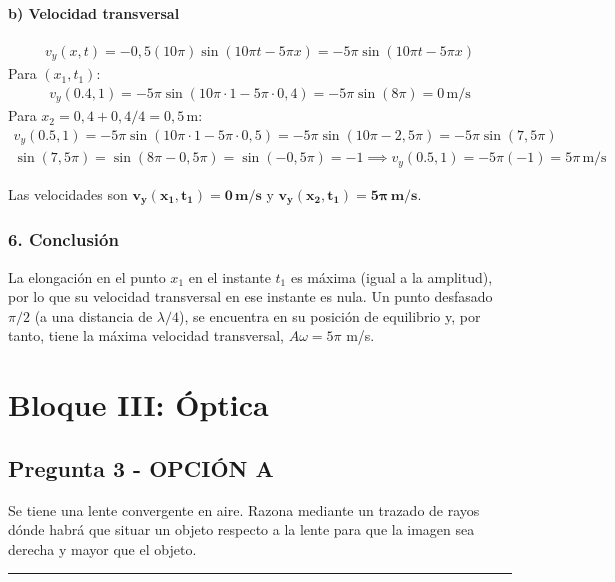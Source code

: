 \paragraph{b) Velocidad transversal}
\begin{gather}
    v_y(x,t) = -0,5(10\pi)\sin(10\pi t - 5\pi x) = -5\pi\sin(10\pi t - 5\pi x)
\end{gather}
Para $(x_1, t_1)$:
\begin{gather}
    v_y(0.4, 1) = -5\pi\sin(10\pi \cdot 1 - 5\pi \cdot 0,4) = -5\pi\sin(8\pi) = 0\,\text{m/s}
\end{gather}
Para $x_2 = 0,4 + 0,4/4 = 0,5\,\text{m}$:
\begin{gather}
    v_y(0.5, 1) = -5\pi\sin(10\pi \cdot 1 - 5\pi \cdot 0,5) = -5\pi\sin(10\pi - 2,5\pi) = -5\pi\sin(7,5\pi) \nonumber \\
    \sin(7,5\pi) = \sin(8\pi - 0,5\pi) = \sin(-0,5\pi) = -1 \implies v_y(0.5,1) = -5\pi(-1) = 5\pi\,\text{m/s}
\end{gather}
\begin{cajaresultado}
    Las velocidades son $\boldsymbol{v_y(x_1,t_1)=0\,\textbf{m/s}}$ y $\boldsymbol{v_y(x_2,t_1)=5\pi\,\textbf{m/s}}$.
\end{cajaresultado}
\subsubsection*{6. Conclusión}
\begin{cajaconclusion}
La elongación en el punto $x_1$ en el instante $t_1$ es máxima (igual a la amplitud), por lo que su velocidad transversal en ese instante es nula. Un punto desfasado $\pi/2$ (a una distancia de $\lambda/4$), se encuentra en su posición de equilibrio y, por tanto, tiene la máxima velocidad transversal, $A\omega = 5\pi$ m/s.
\end{cajaconclusion}
\newpage

\section{Bloque III: Óptica}
\label{sec:optica_2018_jul_ext}

\subsection{Pregunta 3 - OPCIÓN A}
\label{subsec:3A_2018_jul_ext}
\begin{cajaenunciado}
Se tiene una lente convergente en aire. Razona mediante un trazado de rayos dónde habrá que situar un objeto respecto a la lente para que la imagen sea derecha y mayor que el objeto.
\end{cajaenunciado}
\hrule
